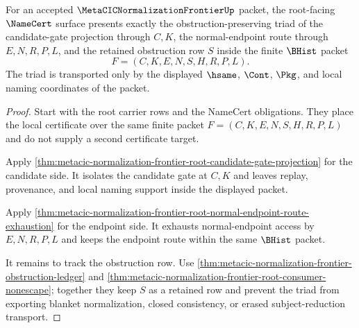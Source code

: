 \begin{theorem}
\label{thm:metacic-normalization-frontier-root-obstruction-preserving-namecert-triad}
For an accepted $\MetaCICNormalizationFrontierUp$ packet, the root-facing $\NameCert$ surface presents exactly the obstruction-preserving triad of the candidate-gate projection through $C,K$, the normal-endpoint route through $E,N,R,P,L$, and the retained obstruction row $S$ inside the finite $\BHist$ packet
$$
F=(C,K,E,N,S,H,R,P,L).
$$
The triad is transported only by the displayed $\hsame$, $\Cont$, $\Pkg$, and local naming coordinates of the packet.
\end{theorem}
\begin{proof}
Start with the root carrier rows and the NameCert obligations. They place the local certificate over the same finite packet $F=(C,K,E,N,S,H,R,P,L)$ and do not supply a second certificate target.

Apply \autoref{thm:metacic-normalization-frontier-root-candidate-gate-projection} for the candidate side. It isolates the candidate gate at $C,K$ and leaves replay, provenance, and local naming support inside the displayed packet.

Apply \autoref{thm:metacic-normalization-frontier-root-normal-endpoint-route-exhaustion} for the endpoint side. It exhausts normal-endpoint access by $E,N,R,P,L$ and keeps the endpoint route within the same $\BHist$ packet.

It remains to track the obstruction row. Use \autoref{thm:metacic-normalization-frontier-obstruction-ledger} and \autoref{thm:metacic-normalization-frontier-root-consumer-nonescape}; together they keep $S$ as a retained row and prevent the triad from exporting blanket normalization, closed consistency, or erased subject-reduction transport.
\end{proof}

